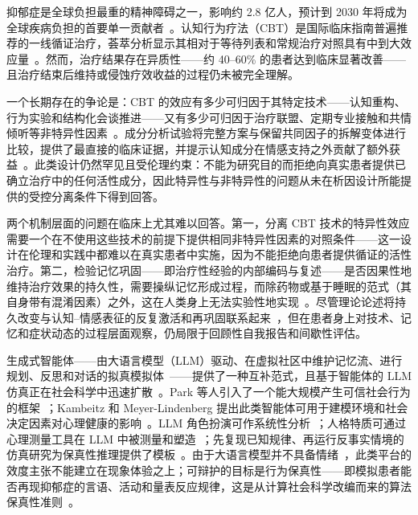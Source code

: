 \documentclass[11pt,a4paper]{article}
\begin{document}

抑郁症是全球负担最重的精神障碍之一，影响约 2.8 亿人，预计到 2030 年将成为全球疾病负担的首要单一贡献者~\cite{who2022}。认知行为疗法（CBT）是国际临床指南普遍推荐的一线循证治疗，荟萃分析显示其相对于等待列表和常规治疗对照具有中到大效应量~\cite{cuijpers2013,hofmann2012}。然而，治疗结果存在异质性——约 40--60\% 的患者达到临床显著改善——且治疗结束后维持或侵蚀疗效收益的过程仍未被完全理解。

一个长期存在的争论是：CBT 的效应有多少可归因于其特定技术——认知重构、行为实验和结构化会谈推进——又有多少可归因于治疗联盟、定期专业接触和共情倾听等非特异性因素~\cite{lambert1992}。成分分析试验将完整方案与保留共同因子的拆解变体进行比较，提供了最直接的临床证据，并提示认知成分在情感支持之外贡献了额外获益~\cite{jacobson1996}。此类设计仍然罕见且受伦理约束：不能为研究目的而拒绝向真实患者提供已确立治疗中的任何活性成分，因此特异性与非特异性的问题从未在析因设计所能提供的受控分离条件下得到回答。

两个机制层面的问题在临床上尤其难以回答。第一，分离 CBT 技术的特异性效应需要一个在不使用这些技术的前提下提供相同非特异性因素的对照条件——这一设计在伦理和实践中都难以在真实患者中实施，因为不能拒绝向患者提供循证的活性治疗。第二，检验记忆巩固——即治疗性经验的内部编码与复述——是否因果性地维持治疗效果的持久性，需要操纵记忆形成过程，而除药物或基于睡眠的范式（其自身带有混淆因素）之外，这在人类身上无法实验性地实现~\cite{rasch2013}。尽管理论论述将持久改变与认知--情感表征的反复激活和再巩固联系起来~\cite{teasdale1988,spens2024}，但在患者身上对技术、记忆和症状动态的过程层面观察，仍局限于回顾性自我报告和间歇性评估。

生成式智能体——由大语言模型（LLM）驱动、在虚拟社区中维护记忆流、进行规划、反思和对话的拟真模拟体~\cite{park2023}——提供了一种互补范式，且基于智能体的 LLM 仿真正在社会科学中迅速扩散~\cite{gao2024}。Park 等人引入了一个能大规模产生可信社会行为的框架~\cite{park2023}；Kambeitz 和 Meyer-Lindenberg 提出此类智能体可用于建模环境和社会决定因素对心理健康的影响~\cite{kambeitz2025npj}。LLM 角色扮演可作系统性分析~\cite{shanahan2023}；人格特质可通过心理测量工具在 LLM 中被测量和塑造~\cite{serapio2025,wright2026}；先复现已知规律、再运行反事实情境的仿真研究为保真性推理提供了模板~\cite{qu2024,ji2026}。由于大语言模型并不具备情绪~\cite{goldenberg2026}，此类平台的效度主张不能建立在现象体验之上；可辩护的目标是行为保真性——即模拟患者能否再现抑郁症的言语、活动和量表反应规律，这是从计算社会科学改编而来的算法保真性准则~\cite{qu2024}。
\end{document}

